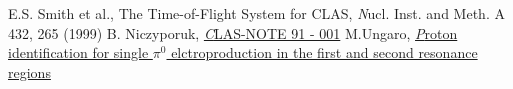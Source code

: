 \begin{thebibliography}{mybib}
                       {E.S. Smith et al.}, The Time-of-Flight System for CLAS,                                      {\textit Nucl. Inst. and Meth. A 432, 265 (1999)}
                   {B. Niczyporuk},     \href{http://www.jlab.org/Hall-B/notes/clas_notes91/note91-001.pdf}      {\textit CLAS-NOTE 91 - 001}
     {M.Ungaro},         \href{https://maureeungaro.github.io/home/meson/pi0_resonance/proton_id} {\textit Proton identification for single $\pi^0$ elctroproduction in the first and second resonance regions}
\end{thebibliography}
